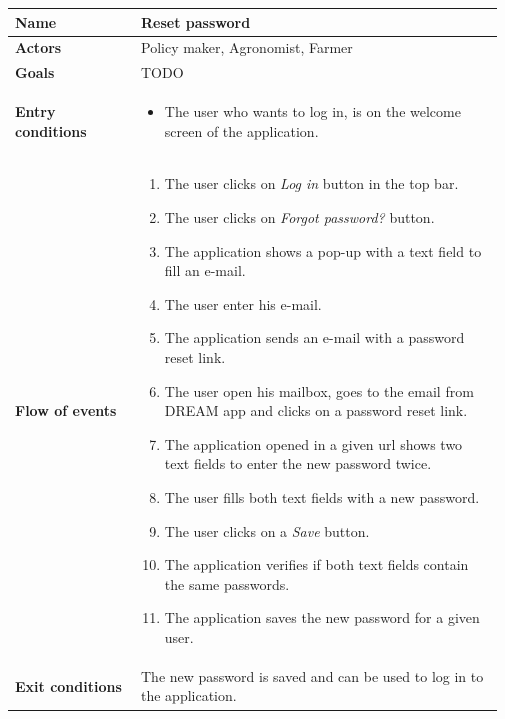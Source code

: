 \begin{table}[H]
    \centering
	\begin{tabular}{@{}p{0.25\linewidth} p{0.72\linewidth}@{}}
\toprule
		\textbf{Name}               & Reset password\\
		\midrule
		\textbf{Actors}             & Policy maker, Agronomist, Farmer\\
		\midrule
		\textbf{Goals}              & TODO \\
		\midrule
		
		\textbf{Entry conditions}   & \begin{itemize}[leftmargin=.4cm,noitemsep,topsep=0pt,before=\vspace{-3mm},after=\vspace{-4mm}]
		    \item The user who wants to log in, is on the welcome screen of the application.
		\end{itemize}\\
		\midrule
		
		\textbf{Flow of events}     & \begin{enumerate}[leftmargin=.4cm,noitemsep,topsep=0pt,before=\vspace{-3mm},after=\vspace{-4mm}]
		    \item The user clicks on \textit{Log in} button in the top bar.
		    \item The user clicks on \textit{Forgot password?} button.
		    \item The application shows a pop-up with a text field to fill an e-mail.
		    \item The user enter his e-mail.
		    \item The application sends an e-mail with a password reset link.
		    \item The user open his mailbox, goes to the email from DREAM app and clicks on a password reset link.
		    \item The application opened in a given url shows two text fields to enter the new password twice.
		    \item The user fills both text fields with a new password.
		    \item The user clicks on a \textit{Save} button.
		    \item The application verifies if both text fields contain the same passwords.
		    \item The application saves the new password for a given user.
		\end{enumerate}\\
		\midrule
		\textbf{Exit conditions}    & The new password is saved and can be used to log in to the application.
		\\ \midrule
		

\end{tabular}
\end{table}
